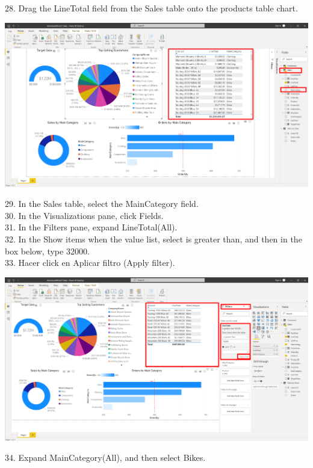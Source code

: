 \documentclass[12pt,letterpaper]{article}
\begin{document}
28. Drag the LineTotal field from the Sales table onto the products table chart.
\begin{center}
    \includegraphics[width=17cm]{img/94.png}
\end{center}
29. In the Sales table, select the MainCategory field.
\\30. In the Visualizations pane, click Fields.
\\31. In the Filters pane, expand LineTotal(All).
\\32. In the Show items when the value list, select is greater than, and then in the box below, type 32000.
\\33. Hacer click en Aplicar filtro (Apply filter).
\begin{center}
    \includegraphics[width=17cm]{img/95.png}
    \vspace{1cm}
\end{center}
34. Expand MainCategory(All), and then select Bikes.
\end{document}
